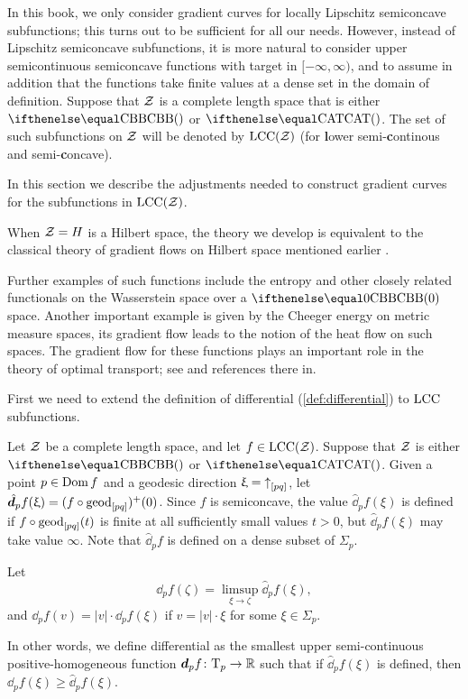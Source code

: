 In this book, we only consider gradient curves for locally Lipschitz semiconcave subfunctions;
this turns out to be sufficient for all our needs.
However, 
instead of Lipschitz semiconcave subfunctions,
it is more natural to consider upper semicontinuous semiconcave functions
with target in $[-\infty,\infty)$,
and to assume in addition that 
the functions take finite values at a dense set in the domain of definition.
Suppose that $\mathcal{Z}$ is a complete length space that is either $\Alex{}$ or $\CAT{}$.
The set of such subfunctions on $\mathcal{Z}$ will be denoted by 
$\mathrm{LCC}(\mathcal{Z})$ (for \textbf{l}ower semi-\textbf{c}ontinous and semi-\textbf{c}oncave).

In this section we describe the adjustments needed
to construct gradient curves for the subfunctions in $\mathrm{LCC}(\mathcal{Z})$.

When $\mathcal{Z}=H$ is a Hilbert space, the theory we develop is equivalent to the classical theory of gradient flows on Hilbert space mentioned earlier \cite{Brezis-book}.

Further examples of such functions include the entropy and other closely related functionals on the Wasserstein space over a $\Alex0$ space.
Another important example is given by the Cheeger energy on metric measure spaces, its gradient flow leads to the notion of the heat flow on such spaces.
The gradient flow for these functions plays an important role in the theory of optimal transport; see \cite{villani} and references there in. 


First we need to extend the definition of differential (\ref{def:differential}) to $\mathrm{LCC}$ subfunctions.

Let $\mathcal{Z}$ be a complete length space, and let $f\in\LSCSC(\spc{Z})$.
Suppose that $\mathcal{Z}$ is either $\Alex{}$ or $\CAT{}$.
Given a point $p\in \Dom f$ and a geodesic direction $\upxi={\uparrow}_{[{p}{q}]}$, 
let 
$\hat \dd_pf(\xi)=(f\circ\geod_{[pq]})^+(0)$.
Since $f$ is semiconcave, the value $\hat \dd_pf(\xi)$ is defined if $f\circ\geod_{[pq]}(t)$ is finite at all sufficiently small values $t>0$,
but $\hat \dd_pf(\xi)$ may take value $\infty$. 
Note that $\hat \dd_pf$ is defined on a dense subset of $\Sigma_p$.

Let 
\[\dd_pf(\zeta)=\limsup_{\xi\to\zeta}\hat\dd_pf(\xi),\]
and $\dd_pf(v)=|v|\cdot \dd_pf(\xi)$ if $v=|v|\cdot\xi$ for some $\xi\in\Sigma_p$.

In other words, we define differential as the smallest 
upper semi-continuous  positive-homogeneous function $\dd_pf\:\T_p\to\RR$
such that if $\hat\dd_pf(\xi)$ is defined, then $\dd_pf(\xi)\ge \hat \dd_pf(\xi)$.



